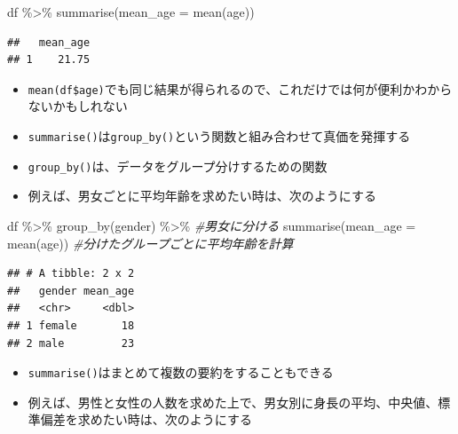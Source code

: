 \documentclass[
]{book}
\newenvironment{Shaded}{\begin{snugshade}}{\end{snugshade}}
\newcommand{\AttributeTok}[1]{\textcolor[rgb]{0.77,0.63,0.00}{#1}}
\newcommand{\CommentTok}[1]{\textcolor[rgb]{0.56,0.35,0.01}{\textit{#1}}}
\newcommand{\FunctionTok}[1]{\textcolor[rgb]{0.00,0.00,0.00}{#1}}
\newcommand{\NormalTok}[1]{#1}
\newcommand{\SpecialCharTok}[1]{\textcolor[rgb]{0.00,0.00,0.00}{#1}}
\providecommand{\tightlist}{%
  \setlength{\itemsep}{0pt}\setlength{\parskip}{0pt}}
\begin{document}
\begin{Shaded}
\begin{Highlighting}[]
\NormalTok{df }\SpecialCharTok{\%\textgreater{}\%}
  \FunctionTok{summarise}\NormalTok{(}\AttributeTok{mean\_age =} \FunctionTok{mean}\NormalTok{(age))}
\end{Highlighting}
\end{Shaded}

\begin{verbatim}
##   mean_age
## 1    21.75
\end{verbatim}

\begin{itemize}
\tightlist
\item
  \texttt{mean(df\$age)}でも同じ結果が得られるので、これだけでは何が便利かわからないかもしれない
\item
  \texttt{summarise()}は\texttt{group\_by()}という関数と組み合わせて真価を発揮する
\item
  \texttt{group\_by()}は、データをグループ分けするための関数
\item
  例えば、男女ごとに平均年齢を求めたい時は、次のようにする
\end{itemize}

\begin{Shaded}
\begin{Highlighting}[]
\NormalTok{df }\SpecialCharTok{\%\textgreater{}\%}
  \FunctionTok{group\_by}\NormalTok{(gender) }\SpecialCharTok{\%\textgreater{}\%} \CommentTok{\#男女に分ける}
  \FunctionTok{summarise}\NormalTok{(}\AttributeTok{mean\_age =} \FunctionTok{mean}\NormalTok{(age)) }\CommentTok{\#分けたグループごとに平均年齢を計算}
\end{Highlighting}
\end{Shaded}

\begin{verbatim}
## # A tibble: 2 x 2
##   gender mean_age
##   <chr>     <dbl>
## 1 female       18
## 2 male         23
\end{verbatim}

\begin{itemize}
\tightlist
\item
  \texttt{summarise()}はまとめて複数の要約をすることもできる
\item
  例えば、男性と女性の人数を求めた上で、男女別に身長の平均、中央値、標準偏差を求めたい時は、次のようにする
\end{itemize}
\end{document}
